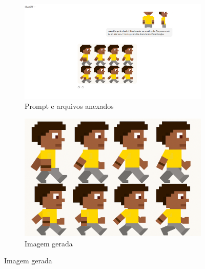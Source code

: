 \begin{figure}[htbp]
    \centering
    \caption{\small Processo da utilização 5 do chatGPT em julho/2025}
    \label{fig:chatGPT6}

    \begin{subfigure}{1\linewidth}
        \includegraphics[width=1\linewidth]{figs/chatGPT/walking_cycle/side_view/tela3.PNG}
        \caption{\small Prompt e arquivos anexados}
        \label{fig:chatGPT6a}
    \end{subfigure}

    \begin{subfigure}{0.5\linewidth}
        \includegraphics[width=1\linewidth]{figs/chatGPT/walking_cycle/side_view/walking cycle 2.png}
        \caption{\small Imagem gerada}
        \label{fig:chatGPT6b}
    \end{subfigure}
\end{figure}